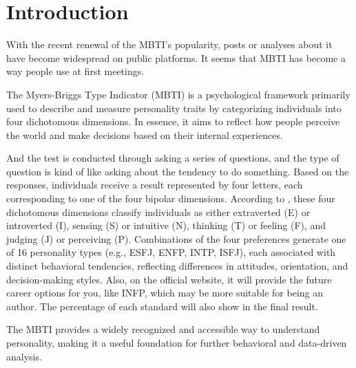 \documentclass[12pt]{article}
\begin{document}
	\tableofcontents
	\newpage
	
	\setcounter{page}{1}
	
	
	
	\section{Introduction}
	With the recent renewal of the MBTI's popularity, posts or analyses about it
	have become widespread on public platforms. It seems that MBTI has become a
	way people use at first meetings.
	
	The Myers-Briggs Type Indicator (MBTI) is a psychological framework
	primarily used to describe and measure personality traits by categorizing
	individuals into four dichotomous dimensions. In essence, it aims to reflect
	how people perceive the world and make decisions based on their internal
	experiences\cite{yang2022research}.
	
	And the test is conducted through asking a series of questions, and the type
	of question is kind of like asking about the tendency to do something. Based
	on the responses, individuals receive a result represented by four letters,
	each corresponding to one of the four bipolar dimensions. According to
	, these four dichotomous dimensions classify
	individuals as either extraverted (E) or introverted (I), sensing (S) or
	intuitive (N), thinking (T) or feeling (F), and judging (J) or perceiving
	(P). Combinations of the four preferences generate one of 16 personality
	types (e.g., ESFJ, ENFP, INTP, ISFJ), each associated with distinct
	behavioral tendencies, reflecting differences in attitudes, orientation, and
	decision-making styles. Also, on the official website, it will provide the
	future career options for you, like INFP, which may be more suitable for
	being an author. The percentage of each standard will also show in the final
	result.
	
	The MBTI provides a widely recognized and accessible way to understand
	personality, making it a useful foundation for further behavioral and
	data-driven analysis.
	
\end{document}
